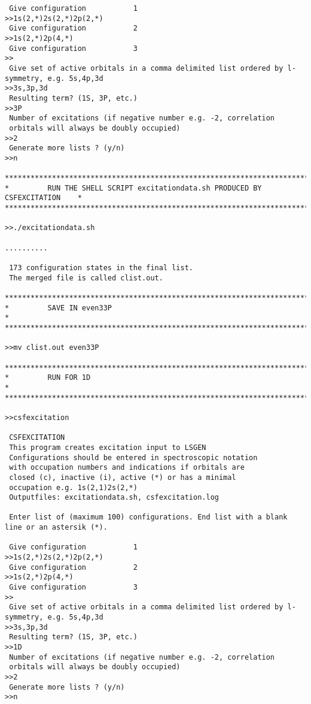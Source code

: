 \documentclass[fleqn,10pt]{book}
\begin{document}
\begin{verbatim}
 Give configuration           1
>>1s(2,*)2s(2,*)2p(2,*)
 Give configuration           2
>>1s(2,*)2p(4,*)
 Give configuration           3
>>
 Give set of active orbitals in a comma delimited list ordered by l-symmetry, e.g. 5s,4p,3d
>>3s,3p,3d
 Resulting term? (1S, 3P, etc.)
>>3P
 Number of excitations (if negative number e.g. -2, correlation 
 orbitals will always be doubly occupied)                        
>>2
 Generate more lists ? (y/n)
>>n

*******************************************************************************
*         RUN THE SHELL SCRIPT excitationdata.sh PRODUCED BY CSFEXCITATION    *
*******************************************************************************

>>./excitationdata.sh

..........

 173 configuration states in the final list.
 The merged file is called clist.out.

*******************************************************************************
*         SAVE IN even33P                                                     *
*******************************************************************************

>>mv clist.out even33P

*******************************************************************************
*         RUN FOR 1D                                                          *
*******************************************************************************

>>csfexcitation

 CSFEXCITATION
 This program creates excitation input to LSGEN
 Configurations should be entered in spectroscopic notation
 with occupation numbers and indications if orbitals are
 closed (c), inactive (i), active (*) or has a minimal
 occupation e.g. 1s(2,1)2s(2,*)
 Outputfiles: excitationdata.sh, csfexcitation.log

 Enter list of (maximum 100) configurations. End list with a blank line or an astersik (*).

 Give configuration           1
>>1s(2,*)2s(2,*)2p(2,*)
 Give configuration           2
>>1s(2,*)2p(4,*)
 Give configuration           3
>>
 Give set of active orbitals in a comma delimited list ordered by l-symmetry, e.g. 5s,4p,3d
>>3s,3p,3d
 Resulting term? (1S, 3P, etc.)
>>1D
 Number of excitations (if negative number e.g. -2, correlation 
 orbitals will always be doubly occupied)                        
>>2
 Generate more lists ? (y/n)
>>n


\end{verbatim}
\end{document}

